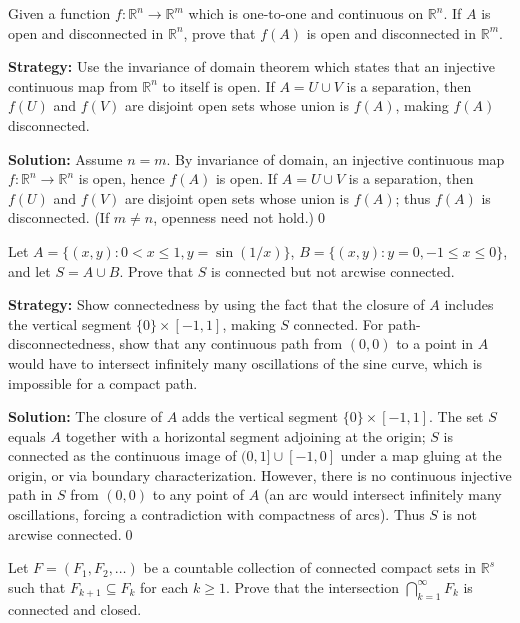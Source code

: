 \begin{problembox}
Given a function $f : \mathbb{R}^n \to \mathbb{R}^m$ which is one-to-one and continuous on $\mathbb{R}^n$. If $A$ is open and disconnected in $\mathbb{R}^n$, prove that $f(A)$ is open and disconnected in $\mathbb{R}^m$.
\end{problembox}

\noindent\textbf{Strategy:} Use the invariance of domain theorem which states that an injective continuous map from $\mathbb{R}^n$ to itself is open. If $A = U \cup V$ is a separation, then $f(U)$ and $f(V)$ are disjoint open sets whose union is $f(A)$, making $f(A)$ disconnected.

\bigskip\noindent\textbf{Solution:}
Assume $n=m$. By invariance of domain, an injective continuous map $f:\mathbb{R}^n\to\mathbb{R}^n$ is open, hence $f(A)$ is open. If $A=U\cup V$ is a separation, then $f(U)$ and $f(V)$ are disjoint open sets whose union is $f(A)$; thus $f(A)$ is disconnected. (If $m\ne n$, openness need not hold.)\qed



\begin{problembox}
Let $A = \{(x, y) : 0 < x \leq 1, y = \sin(1/x)\}$, $B = \{(x, y) : y = 0, -1 \leq x \leq 0\}$, and let $S = A \cup B$. Prove that $S$ is connected but not arcwise connected.
\end{problembox}

\noindent\textbf{Strategy:} Show connectedness by using the fact that the closure of $A$ includes the vertical segment $\{0\} \times [-1,1]$, making $S$ connected. For path-disconnectedness, show that any continuous path from $(0,0)$ to a point in $A$ would have to intersect infinitely many oscillations of the sine curve, which is impossible for a compact path.

\bigskip\noindent\textbf{Solution:}
The closure of $A$ adds the vertical segment $\{0\}\times[-1,1]$. The set $S$ equals $A$ together with a horizontal segment adjoining at the origin; $S$ is connected as the continuous image of $(0,1]\cup[-1,0]$ under a map gluing at the origin, or via boundary characterization. However, there is no continuous injective path in $S$ from $(0,0)$ to any point of $A$ (an arc would intersect infinitely many oscillations, forcing a contradiction with compactness of arcs). Thus $S$ is not arcwise connected.\qed



\begin{problembox}
Let $F = (F_1, F_2, \ldots)$ be a countable collection of connected compact sets in $\mathbb{R}^s$ such that $F_{k+1} \subseteq F_k$ for each $k \geq 1$. Prove that the intersection $\bigcap_{k=1}^{\infty} F_k$ is connected and closed.
\end{problembox}

